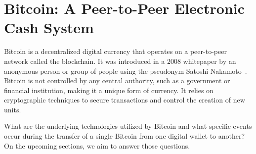 \section{Bitcoin: A Peer-to-Peer Electronic Cash System}
Bitcoin is a decentralized digital currency that operates on a peer-to-peer network called the blockchain. It was introduced in a 2008
whitepaper by an anonymous person or group of people using the pseudonym Satoshi Nakamoto~\cite{nakamoto2008bitcoin}. Bitcoin is not
controlled by any central authority, such as a government or financial institution, making it a unique form of currency. It relies on
cryptographic techniques to secure transactions and control the creation of new units.

What are the underlying technologies utilized by Bitcoin and what specific events occur during the transfer of a single Bitcoin from one
digital wallet to another? On the upcoming sections, we aim to answer those questions.













